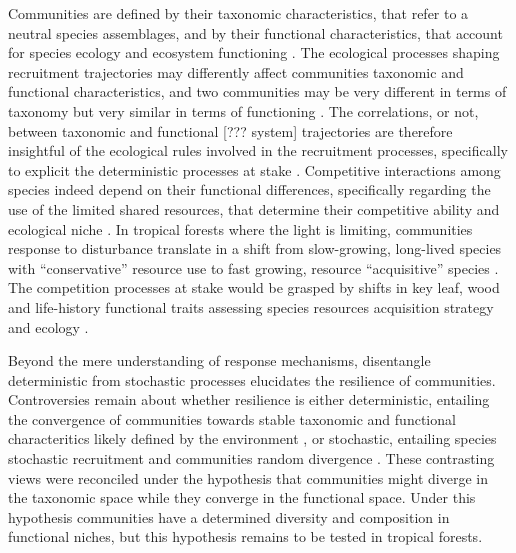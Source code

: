 \documentclass[fleqn,10pt]{ArtEcoFoG} %
\begin{document}
Communities are defined by their taxonomic characteristics, that refer
to a neutral species assemblages, and by their functional
characteristics, that account for species ecology and ecosystem
functioning \citep{Violle2007b, Kunstler2016}. The ecological processes
shaping recruitment trajectories may differently affect communities
taxonomic and functional characteristics, and two communities may be
very different in terms of taxonomy but very similar in terms of
functioning \citep{Villeger2012}. The correlations, or not, between
taxonomic and functional {[}??? system{]} trajectories are therefore
insightful of the ecological rules involved in the recruitment
processes, specifically to explicit the deterministic processes at stake
\citep{Mayfield2010, Fukami2005}. Competitive interactions among species
indeed depend on their functional differences, specifically regarding
the use of the limited shared resources, that determine their
competitive ability and ecological niche \citep{Webb2002, Perronne2017}.
In tropical forests where the light is limiting, communities response to
disturbance translate in a shift from slow-growing, long-lived species
with ``conservative'' resource use to fast growing, resource
``acquisitive'' species \citep{Denslow1980, Molino2001, Bongers2009}.\\
The competition processes at stake would be grasped by shifts in key
leaf, wood and life-history functional traits assessing species
resources acquisition strategy and ecology
\citep{Wright2004, Chave2009b, Herault2011, Gerhold2015}.

Beyond the mere understanding of response mechanisms, disentangle
deterministic from stochastic processes elucidates the resilience of
communities. Controversies remain about whether resilience is either
deterministic, entailing the convergence of communities towards stable
taxonomic and functional characteritics likely defined by the
environment \citep{Clements1916}, or stochastic, entailing species
stochastic recruitment and communities random divergence
\citep{Diamond1975}. These contrasting views were reconciled under the
hypothesis that communities might diverge in the taxonomic space while
they converge in the functional space. Under this hypothesis communities
have a determined diversity and composition in functional niches, but
this hypothesis remains to be tested in tropical forests.
\end{document}

